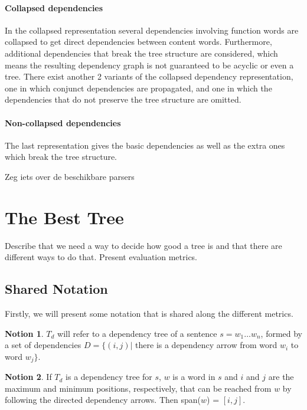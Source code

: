 \documentclass{report}
\theoremstyle{definition}
\newtheorem{notion}{Notion}
\theoremstyle{plain}
\begin{document}
\paragraph{Collapsed dependencies} In the collapsed representation several dependencies involving function words are collapsed to get direct dependencies between content words. Furthermore, additional dependencies that break the tree structure are considered, which means the resulting dependency graph is not guaranteed to be acyclic or even a tree. There exist another 2 variants of the collapsed dependency representation, one in which conjunct dependencies are propagated, and one in which the dependencies that do not preserve the tree structure are omitted.
\paragraph{Non-collapsed dependencies} The last representation gives the basic dependencies as well as the extra ones which break the tree structure.

Zeg iets over de beschikbare parsers \cite{de2006generating}

\section{The Best Tree}

Describe that we need a way to decide how good a tree is and that there are different ways to do that. Present evaluation metrics.

\subsection{Shared Notation}

Firstly, we will present some notation that is shared along the different metrics.

\begin{notion}
$T_d$ will refer to a dependency tree of a sentence $s = w_1 \dots w_n$, formed by a set of dependencies $D = \{ (i,j) |$ there is a dependency arrow from word $w_i$ to word $w_j \}$.
\end{notion}

\begin{notion}
If $T_d$ is a dependency tree for $s$, $w$ is a word in $s$ and $i$ and $j$ are the maximum and minimum positions, respectively, that can be reached from $w$ by following the directed dependency arrows. Then span($w$) = $[i,j]$.
\end{notion}
\end{document}
